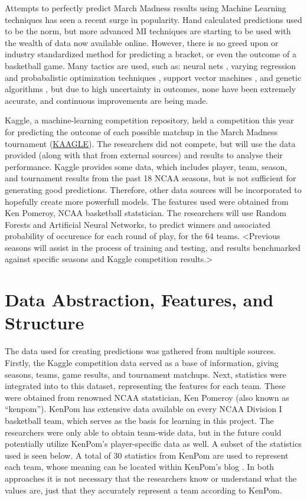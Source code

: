 \documentclass[conference]{IEEEtran}
\begin{document}
Attempts to perfectly predict March Madness results using Machine Learning techniques has seen a recent surge in popularity. 
Hand calculated predictions used to be the norm, but more advanced MI techniques are starting to be used with the wealth of data now available online. 
However, there is no greed upon or industry standardized method for predicting a bracket, or even the outcome of a basketball game. 
Many tactics are used, such as: neural nets \cite{KarlLeswing}, varying regression and probabalistic optimization techniques \cite{adams-dahl-murray-2010a, DannyTarlow, BradyWest, BradleyCarlin, ProbModelsNCAA-1991, MoreProbModelsNCAA-1996}, support vector machines \cite{KennethDeakins}, and genetic algorithms \cite{ScottTurner}, but due to high uncertainty in outcomes, none have been extremely accurate, and continuous improvements are being made.

Kaggle, a machine-learning competition repository, held a competition this year for predicting the outcome of each possible matchup in the March Madness tournament (\url{KAAGLE}).
The researchers did not compete, but will use the data provided (along with that from external sources) and results to analyse their performance.
Kaggle provides some data, which includes player, team, season, and tournament results from the past 18 NCAA seasons, but is not sufficient for generating good predictions.
Therefore, other data sources will be incorporated to hopefully create more powerfull models. The features used were obtained from Ken Pomeroy, NCAA basketball statstician.
The researchers will use Random Forests and Artificial Neural Networks, to predict winners and associated probability of occurence for each round of play, for the 64 teams.
<Previous seasons will assist in the process of training and testing, and results benchmarked against specific seasons and Kaggle competition results.>


\section{Data Abstraction, Features, and Structure}
The data used for creating predictions was gathered from multiple sources. Firstly, the Kaggle competition data served as a base of information, giving seasons, teams, game results, and tournament matchups.
Next, statistics were integrated into to this dataset, representing the features for each team. 
These were obtained from renowned NCAA statstician, Ken Pomeroy (also known as ``kenpom'').
KenPom has extensive data available on every NCAA Division I basketball team, which serves as the basis for learning in this project.
The researchers were only able to obtain team-wide data, but in the future could potentially utilize KenPom's player-specific data as well. 
A subset of the statistics used is seen below. 
A total of 30 statistics from KenPom are used to represent each team, whose meaning can be located within KenPom's blog \cite{KenPom}. 
In both approaches it is not necessary that the researchers know or understand what the values are, just that they accurately represent a team according to KenPom.
\end{document}
